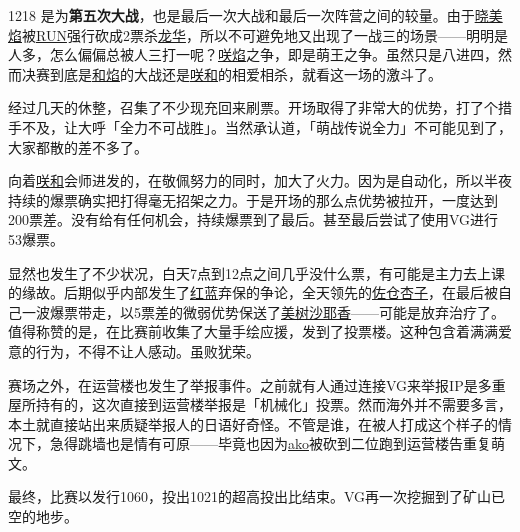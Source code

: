 

1218 是为\textbf{第五次大战}，也是最后一次大战和最后一次阵营之间的较量。由于\uline{晓美焰}被\uline{RUN}强行砍成2票杀\uline{龙华}，所以不可避免地又出现了一战三的场景——明明是人多，怎么偏偏总被人三打一呢？\uline{咲焰}之争，即是萌王之争。虽然只是八进四，然而决赛到底是\uline{和焰}的大战还是\uline{咲}\uline{和}的相爱相杀，就看这一场的激斗了。

经过几天的休整，召集了不少现充回来刷票。开场取得了非常大的优势，打了个措手不及，让大呼「全力不可战胜」。当然承认道，「萌战传说全力」不可能见到了，大家都散的差不多了。

向着\uline{咲}\uline{和}会师进发的，在敬佩努力的同时，加大了火力。因为是自动化，所以半夜持续的爆票确实把打得毫无招架之力。于是开场的那么点优势被拉开，一度达到200票差。没有给有任何机会，持续爆票到了最后。甚至最后尝试了使用VG进行53爆票。

显然也发生了不少状况，白天7点到12点之间几乎没什么票，有可能是主力去上课的缘故。后期似乎内部发生了\uline{红蓝}弃保的争论，全天领先的\uline{佐仓杏子}，在最后被自己一波爆票带走，以5票差的微弱优势保送了\uline{美树沙耶香}——可能是放弃治疗了。值得称赞的是，在比赛前收集了大量手绘应援，发到了投票楼。这种包含着满满爱意的行为，不得不让人感动。虽败犹荣。

赛场之外，在运营楼也发生了举报事件。之前就有人通过连接VG来举报IP是多重屋所持有的，这次直接到运营楼举报是「机械化」投票。然而海外并不需要多言，本土就直接站出来质疑举报人的日语好奇怪。不管是谁，在被人打成这个样子的情况下，急得跳墙也是情有可原——毕竟也因为\uline{ako}被砍到二位跑到运营楼告重复萌文。

最终，比赛以发行1060，投出1021的超高投出比结束。VG再一次挖掘到了矿山已空的地步。

